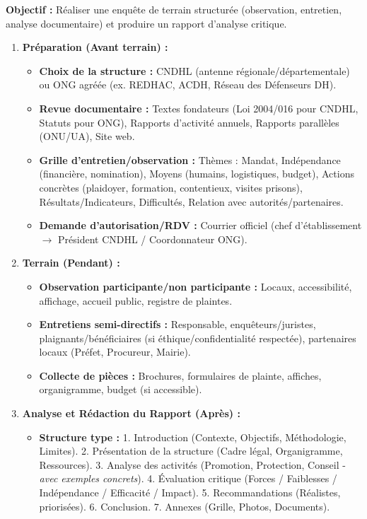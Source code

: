 \documentclass[11pt]{article}
\begin{document}
\begin{methode}
    \textbf{Objectif :} Réaliser une enquête de terrain structurée (observation, entretien, analyse documentaire) et produire un rapport d'analyse critique.
    \begin{enumerate}
        \item \textbf{Préparation (Avant terrain) :}
            \begin{itemize}
                \item \textbf{Choix de la structure :} CNDHL (antenne régionale/départementale) ou ONG agréée (ex. REDHAC, ACDH, Réseau des Défenseurs DH).
                \item \textbf{Revue documentaire :} Textes fondateurs (Loi 2004/016 pour CNDHL, Statuts pour ONG), Rapports d'activité annuels, Rapports parallèles (ONU/UA), Site web.
                \item \textbf{Grille d'entretien/observation :} Thèmes : Mandat, Indépendance (financière, nomination), Moyens (humains, logistiques, budget), Actions concrètes (plaidoyer, formation, contentieux, visites prisons), Résultats/Indicateurs, Difficultés, Relation avec autorités/partenaires.
                \item \textbf{Demande d'autorisation/RDV :} Courrier officiel (chef d'établissement $\rightarrow$ Président CNDHL / Coordonnateur ONG).
            \end{itemize}
        \item \textbf{Terrain (Pendant) :}
            \begin{itemize}
                \item \textbf{Observation participante/non participante :} Locaux, accessibilité, affichage, accueil public, registre de plaintes.
                \item \textbf{Entretiens semi-directifs :} Responsable, enquêteurs/juristes, plaignants/bénéficiaires (si éthique/confidentialité respectée), partenaires locaux (Préfet, Procureur, Mairie).
                \item \textbf{Collecte de pièces :} Brochures, formulaires de plainte, affiches, organigramme, budget (si accessible).
            \end{itemize}
        \item \textbf{Analyse et Rédaction du Rapport (Après) :}
            \begin{itemize}
                \item \textbf{Structure type :} 1. Introduction (Contexte, Objectifs, Méthodologie, Limites). 2. Présentation de la structure (Cadre légal, Organigramme, Ressources). 3. Analyse des activités (Promotion, Protection, Conseil - \emph{avec exemples concrets}). 4. Évaluation critique (Forces / Faiblesses / Indépendance / Efficacité / Impact). 5. Recommandations (Réalistes, priorisées). 6. Conclusion. 7. Annexes (Grille, Photos, Documents).

\end{itemize}
\end{enumerate}
\end{methode}
\end{document}
